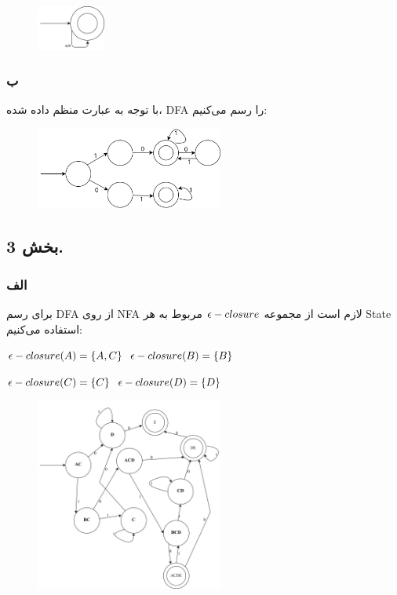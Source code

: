 \begin{figure}[htbp]
	\centering
	\includegraphics[width=0.20\textwidth]{q3s2p1.png}
\end{figure}


\pagebreak
\subsubsection*{ب}
با توجه به عبارت منظم داده شده، DFA را رسم می‌کنیم:
\begin{figure}[htbp]
	\centering
	\includegraphics[width=0.55\textwidth]{q3s2p2.png}
\end{figure}

\subsection*{بخش 3.}
\subsubsection*{الف}
برای رسم DFA از روی NFA لازم است از مجموعه ${\LARGE \epsilon} - closure$ مربوط به هر State استفاده می‌کنیم:

\setLTR

${\LARGE \epsilon} - closure(A)= \left\{A,C\right\}$ \hspace{1em} ${\LARGE \epsilon} - closure(B)= \left\{B\right\}$ 

${\LARGE \epsilon} - closure(C)=\left\{C\right\}$  \hspace{1.9em}  ${\LARGE \epsilon} - closure(D)= \left\{D\right\}$ 

\setRTL

\begin{figure}[htbp]
	\centering
	\includegraphics[width=0.55\textwidth]{q3s3p1.png}
\end{figure}

